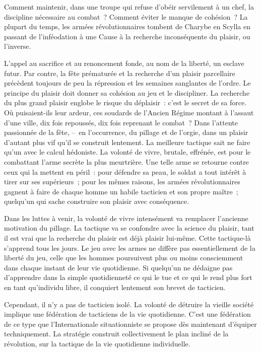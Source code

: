 \documentclass[french,twoside]{book} %
\begin{document}
\noindent Comment maintenir, dans une troupe qui refuse d’obéir servilement à un chef, la discipline nécessaire au combat ? Comment éviter le manque de cohésion ? La plupart du temps, les armées révolutionnaires tombent de Charybe en Scylla en passant de l’inféodation à une Cause à la recherche inconséquente du plaisir, ou l’inverse.\par
L’appel au sacrifice et au renoncement fonde, au nom de la liberté, un esclave futur. Par contre, la fête prématurée et la recherche d’un plaisir parcellaire précèdent toujours de peu la répression et les semaines sanglantes de l’ordre. Le principe du plaisir doit donner sa cohésion au jeu et le discipliner. La recherche du plus grand plaisir englobe le risque du déplaisir : c’est le secret de sa force. Où puisaient-ils leur ardeur, ces soudards de l’Ancien Régime montant à l’assaut d’une ville, dix fois repoussés, dix fois reprenant le combat ? Dans l’attente passionnée de la fête, – en l’occurrence, du pillage et de l’orgie, dans un plaisir d’autant plus vif qu’il se construit lentement. La meilleure tactique sait ne faire qu’un avec le calcul hédoniste. La volonté de vivre, brutale, effrénée, est pour le combattant l’arme secrète la plus meurtrière. Une telle arme se retourne contre ceux qui la mettent en péril : pour défendre sa peau, le soldat a tout intérêt à tirer sur ses supérieurs ; pour les mêmes raisons, les armées révolutionnaires gagnent à faire de chaque homme un habile tacticien et son propre maître ; quelqu’un qui sache construire son plaisir avec conséquence.\par
Dans les luttes à venir, la volonté de vivre intensément va remplacer l’ancienne motivation du pillage. La tactique va se confondre avec la science du plaisir, tant il est vrai que la recherche du plaisir est déjà plaisir lui-même. Cette tactique-là s’apprend tous les jours. Le jeu avec les armes ne diffère pas essentiellement de la liberté du jeu, celle que les hommes poursuivent plus ou moins consciemment dans chaque instant de leur vie quotidienne. Si quelqu’un ne dédaigne pas d’apprendre dans la simple quotidienneté ce qui le tue et ce qui le rend plus fort en tant qu’individu libre, il conquiert lentement son brevet de tacticien.\par
Cependant, il n’y a pas de tacticien isolé. La volonté de détruire la vieille société implique une fédération de tacticiens de la vie quotidienne. C’est une fédération de ce type que l’Internationale situationniste se propose dès maintenant d’équiper techniquement. La stratégie construit collectivement le plan incliné de la révolution, sur la tactique de la vie quotidienne individuelle.\par
\end{document}
